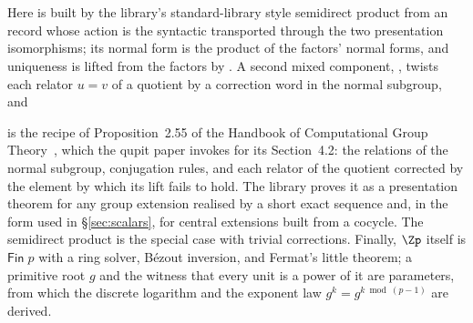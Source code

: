 \endgroup
\begin{code}[hide]%
%
\>[4]\AgdaSpace{}%
\AgdaSymbol{=}\AgdaSpace{}%
\<%
\\
%
\\[\AgdaEmptyExtraSkip]%
\>[0]\AgdaSpace{}%
\AgdaSymbol{:}\AgdaSpace{}%
\AgdaSpace{}%
\AgdaSpace{}%
\AgdaSpace{}%
\AgdaSpace{}%
\AgdaSpace{}%
\AgdaSpace{}%
\AgdaSpace{}%
\AgdaSpace{}%
\<%
\end{code}

\noindent Here  is built by the library's standard-library
style semidirect product from an  record whose action is the
syntactic  transported through the two presentation
isomorphisms; its normal form is the product of the factors' normal
forms, and uniqueness is lifted from the factors by
.  A second mixed component, ,
twists each relator $u = v$ of a quotient by a correction word in the
normal subgroup, and
\begingroup\renewcommand{\AgdaCodeStyle}{\footnotesize}
\begin{code}%
\>[0]\AgdaSpace{}%
\AgdaSpace{}%
\AgdaSpace{}%
\AgdaSpace{}%
\AgdaSpace{}%
\AgdaSymbol{=}\AgdaSpace{}%
\AgdaSpace{}%
\AgdaSpace{}%
\AgdaSpace{}%
\AgdaSpace{}%
\AgdaSymbol{(}\AgdaSpace{}%
\AgdaSpace{}%
\AgdaSpace{}%
\AgdaSpace{}%
\AgdaSpace{}%
\AgdaSymbol{)}\<%
\end{code}
\endgroup
is the recipe of Proposition~2.55 of the Handbook of Computational Group
Theory~\cite{holt2005handbook}, which the qupit paper invokes for its
Section~4.2: the relations of the normal subgroup, conjugation rules,
and each relator of the quotient corrected by the element by which its
lift fails to hold.  The library proves it as a presentation theorem for
any group extension realised by a short exact sequence and, in the form
used in \S\ref{sec:scalars}, for central extensions built from a
cocycle.  The semidirect product is the special case with trivial
corrections.  Finally, $\Zp$ itself is $\mathsf{Fin}\;p$ with a ring
solver, B\'ezout inversion, and Fermat's little theorem; a primitive
root $g$ and the witness that every unit is a power of it are
parameters, from which the discrete logarithm and the exponent law
$g^{k} = g^{k \bmod (p-1)}$ are derived.
